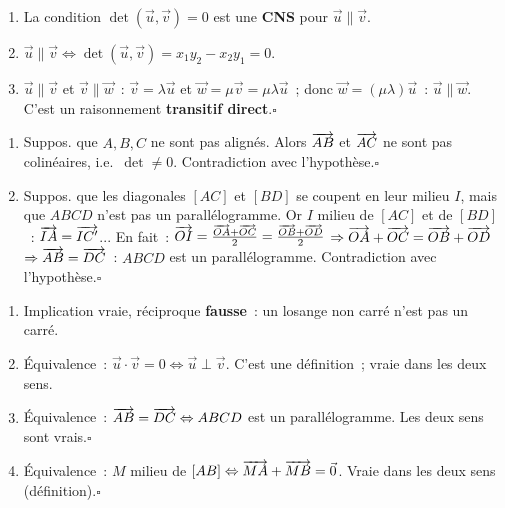 
\begin{enumerate}
  \item La condition $\det(\vec{u},\vec{v})=0$ est une \textbf{CNS} pour $\vec{u}\parallel\vec{v}$.
  \item $\vec{u}\parallel\vec{v}\Leftrightarrow\det(\vec{u},\vec{v})=x_1y_2-x_2y_1=0$.
  \item $\vec{u}\parallel\vec{v}$ et $\vec{v}\parallel\vec{w}$~:
        $\vec{v}=\lambda\vec{u}$ et $\vec{w}=\mu\vec{v}=\mu\lambda\vec{u}$~;
        donc $\vec{w}=(\mu\lambda)\vec{u}$~: $\vec{u}\parallel\vec{w}$.
        C'est un raisonnement \textbf{transitif direct}.\hfill$\square$
\end{enumerate}


\begin{enumerate}
  \item Suppos. que $A,B,C$ ne sont pas align\'es.
        Alors $\overrightarrow{AB}$ et $\overrightarrow{AC}$ ne sont pas colin\'eaires, i.e.\ $\det\ne0$.
        Contradiction avec l'hypoth\`ese.\hfill$\square$
  \item Suppos. que les diagonales $[AC]$ et $[BD]$ se coupent en leur milieu $I$,
        mais que $ABCD$ n'est pas un parall\'elogramme.
        Or $I$ milieu de $[AC]$ et de $[BD]$~: $\overrightarrow{IA}=\overrightarrow{IC'}$... 
        En fait~: $\overrightarrow{OI}=\frac{\overrightarrow{OA}+\overrightarrow{OC}}{2}=\frac{\overrightarrow{OB}+\overrightarrow{OD}}{2}$
        $\Rightarrow\overrightarrow{OA}+\overrightarrow{OC}=\overrightarrow{OB}+\overrightarrow{OD}$
        $\Rightarrow\overrightarrow{AB}=\overrightarrow{DC}$~: $ABCD$ est un parall\'elogramme.
        Contradiction avec l'hypoth\`ese.\hfill$\square$
\end{enumerate}


\begin{enumerate}
  \item Implication vraie, r\'eciproque \textbf{fausse}~:
        un losange non carr\'e n'est pas un carr\'e.
  \item \'Equivalence~: $\vec{u}\cdot\vec{v}=0\Leftrightarrow\vec{u}\perp\vec{v}$.
        C'est une d\'efinition~; vraie dans les deux sens.
  \item \'Equivalence~: $\overrightarrow{AB}=\overrightarrow{DC}\Leftrightarrow ABCD$ est un parall\'elogramme.
        Les deux sens sont vrais.\hfill$\square$
  \item \'Equivalence~: $M$ milieu de $[AB]\Leftrightarrow\overrightarrow{MA}+\overrightarrow{MB}=\vec{0}$.
        Vraie dans les deux sens (d\'efinition).\hfill$\square$
\end{enumerate}

